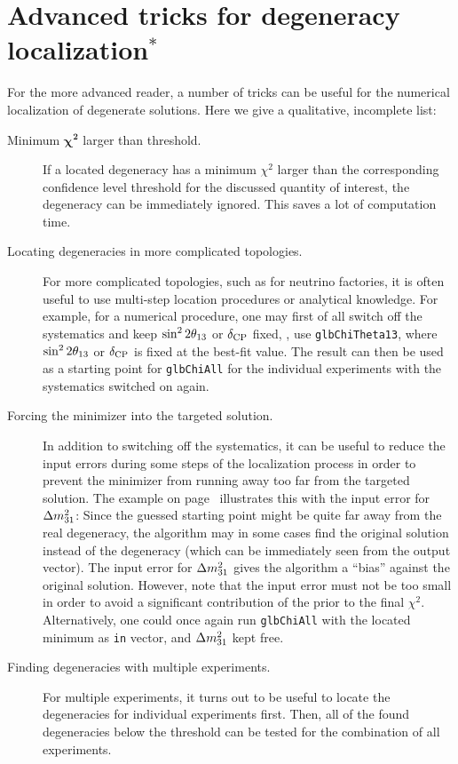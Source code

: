 \section{Advanced tricks for degeneracy localization$^*$}
For the more advanced reader, a number of tricks can be useful for the numerical localization of degenerate solutions. Here we give a qualitative, incomplete list:
\begin{description}
\item[Minimum $\boldsymbol{\chi^2}$ larger than threshold.] If a located degeneracy has a minimum $\chi^2$ larger than the corresponding confidence level threshold for the discussed quantity of interest, the degeneracy can be immediately ignored. This saves a lot of computation time.
\item[Locating degeneracies in more complicated topologies.] For more complicated topologies, such as for neutrino factories, it is often useful to use multi-step location procedures or analytical knowledge. For example, for a numerical procedure, one may first of all switch off the systematics and keep $\sin^2 2 \theta_{13}$ or $\delta_{\mathrm{CP}}$ fixed, \ie, use {\tt glbChiTheta13}, where $\sin^2 2 \theta_{13}$ or $\delta_{\mathrm{CP}}$ is fixed at the best-fit value. The result can then be used as a starting point for {\tt glbChiAll} for the individual experiments with the systematics switched on again. 
\item[Forcing the minimizer into the targeted solution.]
In addition to switching off the systematics, it can be useful to reduce the input errors during some steps of the localization process in order to prevent the minimizer from running away too far from the targeted solution.
The example on page~\pageref{ex:sgndeg} illustrates this with the
input error for $\Delta m_{31}^2$: Since the guessed starting point might be
quite far away from the real degeneracy, the algorithm may in some cases
find the original solution instead of the degeneracy (which can
be immediately seen from the output vector). The input error
for $\Delta m_{31}^2$ gives the algorithm a ``bias'' against the original solution.
However, note that the input error must not be too small in order
to avoid a significant contribution of the prior to the final $\chi^2$.
Alternatively, one could once again run {\tt glbChiAll} with the located 
minimum as {\tt in} vector, and $\Delta m_{31}^2$ kept free.
\item[Finding degeneracies with multiple experiments.] For multiple experiments, it turns out to be useful to locate the degeneracies for individual experiments first. Then, all of the found degeneracies below the threshold can be tested for the combination of all experiments.

\end{description}
